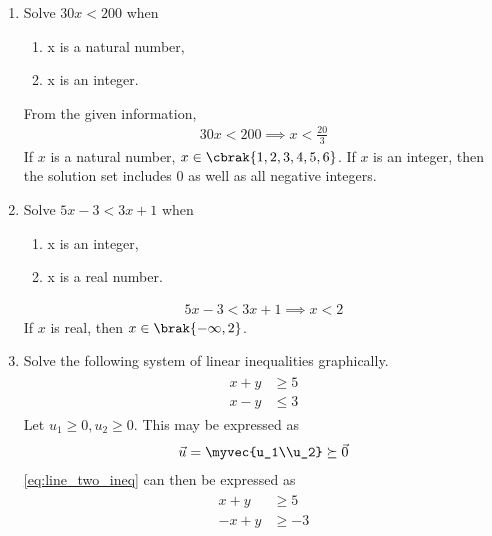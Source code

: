 \renewcommand{\theequation}{\theenumi}
\begin{enumerate}[label=\arabic*.,ref=\thesubsection.\theenumi]
    \item Solve $30x < 200$ when
    \begin{enumerate} 
    \item  x is a natural number,
    \item x is an integer.
\end{enumerate}
\solution From the given information, 
\begin{align}
30x < 200 \implies x < \frac{20}{3}
\label{eq:lineq_nat}
\end{align}
If $x$ is a natural number, $x \in \cbrak{1, 2, 3, 4, 5, 6}$. If $x$ is an integer, then the solution set includes 0 as well as all negative integers.
    \item Solve $5x-3 < 3x+1$ when
    \begin{enumerate} 
\item  x is an integer,
    \item x is a real number.
\end{enumerate}
\solution 
\begin{align}
5x-3 < 3x+1 \implies x < 2
\label{eq:lineq_real}
\end{align}
%
If $x$ is real, then $x \in \brak{-\infty, 2}$. 
    \item Solve the following system of linear inequalities graphically.
\begin{align}
\label{eq:line_two_ineq}
\begin{split}
    x+y &\geq 5
\\
    x-y &\leq 3
\end{split}
\end{align}
\solution  Let $u_1 \ge 0, u_2 \ge 0$.  This may be expressed as
\begin{align}
\vec{u} = \myvec{u_1\\u_2}\succeq \vec{0}
\end{align}
%
\eqref{eq:line_two_ineq} can then be expressed as
\begin{align}
\begin{split}
    x+y &\geq 5
\\
    -x+y &\geq -3
\end{split}
%
\\

\end{align}
\end{enumerate}
